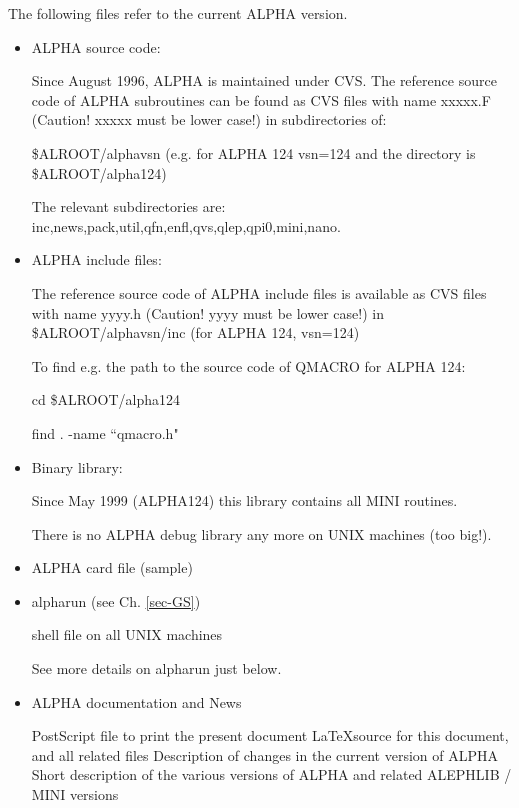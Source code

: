 The following files refer to the current ALPHA version.
 
\begin{itemize}
\item ALPHA source code:
 
Since August 1996, ALPHA is maintained under CVS. The reference source code of ALPHA subroutines can be found
as CVS files with name xxxxx.F (Caution! xxxxx must be lower case!) in subdirectories of:
 
\$ALROOT/alphavsn (e.g. for ALPHA 124 vsn=124 and the directory is \$ALROOT/alpha124)
 
The relevant subdirectories are:
 inc,news,pack,util,qfn,enfl,qvs,qlep,qpi0,mini,nano.
 

\item ALPHA include files: 

The reference source code of ALPHA include files is available as CVS files with name yyyy.h (Caution! yyyy must be lower case!)
 in \$ALROOT/alphavsn/inc  (for ALPHA 124, vsn=124)
 
 
To find e.g. the path to the source code of QMACRO for ALPHA 124:
 
   cd \$ALROOT/alpha124

   find . -name ``qmacro.h" 
 
\item Binary library:
 
\begin{indentlist}{ 2.50cm}{ 2.75cm}

Since May 1999 (ALPHA124) this library contains all MINI routines.

There is no ALPHA debug library any more on UNIX machines (too big!). 

\end{indentlist} 

\item ALPHA card file (sample)
\begin{indentlist}{ 2.50cm}{ 2.75cm}
\hspace*{1in}
\end{indentlist}
 
\item alpharun (see Ch. \ref{sec-GS})
\begin{indentlist}{ 2.50cm}{ 2.75cm}
shell file on all UNIX machines
\par
 See more details on alpharun just below. 
\end{indentlist}

\item ALPHA documentation and News
\begin{indentlist}{ 2.50cm}{ 2.75cm}
PostScript file to print the present document
\LaTeX source for this document, and all related files
Description of changes in the current version of ALPHA
Short description of the various versions of ALPHA and related ALEPHLIB / MINI versions
\end{indentlist}
\end{itemize}
 
